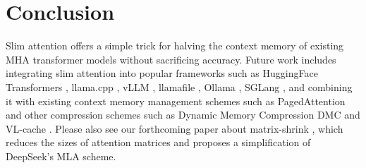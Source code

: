 \documentclass{article}
\begin{document}



\section{Conclusion}
Slim attention offers a simple trick for halving the context memory of existing MHA transformer models without sacrificing accuracy. Future work includes integrating slim attention into popular frameworks such as HuggingFace Transformers \citep{HFtransformers}, llama.cpp \citep{llama-cpp},  vLLM \citep{vLLM}, llamafile \citep{llamafile}, Ollama \citep{ollama}, SGLang \citep{sglang}, and combining it with existing context memory management schemes such as PagedAttention \citep{pagedAttn} and other compression schemes such as Dynamic Memory Compression DMC \citep{DMC} and VL-cache \citep{VL-cache}.
Please also see our forthcoming paper about matrix-shrink \citep{matShrink}, which reduces the sizes of attention matrices and proposes a simplification of DeepSeek's MLA scheme.




\end{document}
